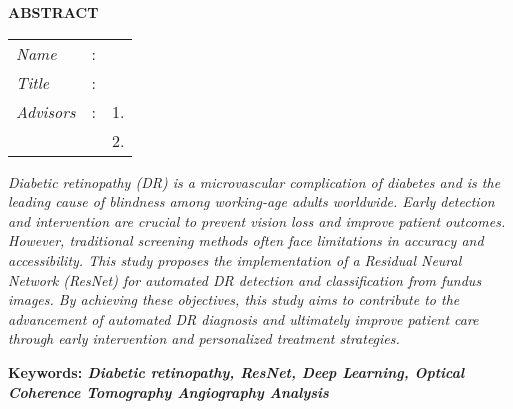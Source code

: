 \begin{center}
  \large\textbf{ABSTRACT}
\end{center}


\vspace{2ex}

\begingroup
\setlength{\tabcolsep}{0pt}

\noindent
\begin{tabularx}{\textwidth}{l >{\centering}m{3em} X}
  \emph{Name}     & : & \name{}         \\

  \emph{Title}    & : & \engtatitle{}   \\

  \emph{Advisors} & : & 1. \advisor{}   \\
                  &   & 2. \coadvisor{} \\
\end{tabularx}
\endgroup

\emph{Diabetic retinopathy (DR) is a microvascular complication of diabetes and is the leading cause of blindness among working-age adults worldwide. Early detection and intervention are crucial to prevent vision loss and improve patient outcomes. However, traditional screening methods often face limitations in accuracy and accessibility. This study proposes the implementation of a Residual Neural Network (ResNet) for automated DR detection and classification from fundus images. By achieving these objectives, this study aims to contribute to the advancement of automated DR diagnosis and ultimately improve patient care through early intervention and personalized treatment strategies.}

\textbf{Keywords: \emph{Diabetic retinopathy, ResNet, Deep Learning, Optical Coherence Tomography Angiography Analysis}}